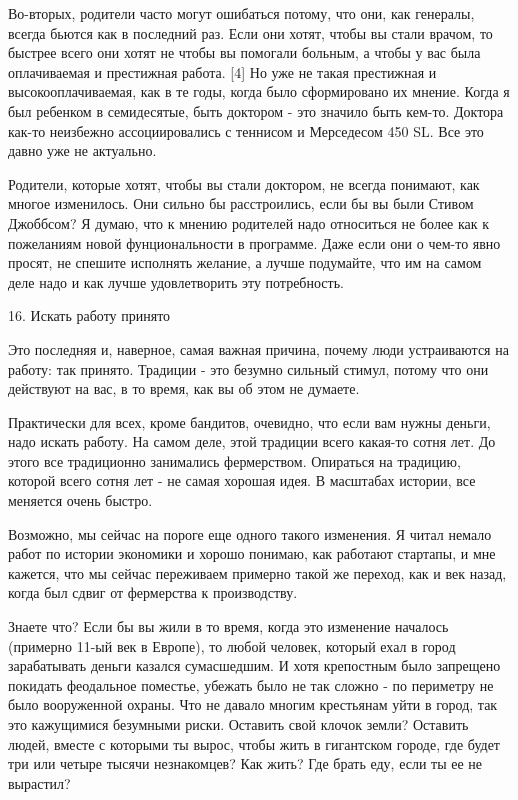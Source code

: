 \documentclass[ebook,12pt,oneside,openany]{memoir}
\begin{document}
Во-вторых, родители часто могут ошибаться потому, что они, как
генералы, всегда бьются как в последний раз. Если они хотят, чтобы вы
стали врачом, то быстрее всего они хотят не чтобы вы помогали больным,
а чтобы у вас была оплачиваемая и престижная работа. [4] Но уже не
такая престижная и высокооплачиваемая, как в те годы, когда было
сформировано их мнение. Когда я был ребенком в семидесятые, быть
доктором - это значило быть кем-то. Доктора как-то неизбежно
ассоциировались с теннисом и Мерседесом 450 SL. Все это давно уже не
актуально.

Родители, которые хотят, чтобы вы стали доктором, не всегда понимают,
как многое изменилось. Они сильно бы расстроились, если бы вы были
Стивом Джоббсом? Я думаю, что к мнению родителей надо относиться не
более как к пожеланиям новой фунциональности в программе. Даже если
они о чем-то явно просят, не спешите исполнять желание, а лучше
подумайте, что им на самом деле надо и как лучше удовлетворить эту
потребность.

16. Искать работу принято

Это последняя и, наверное, самая важная причина, почему люди
устраиваются на работу: так принято. Традиции - это безумно сильный
стимул, потому что они действуют на вас, в то время, как вы об этом не
думаете.

Практически для всех, кроме бандитов, очевидно, что если вам нужны
деньги, надо искать работу. На самом деле, этой традиции всего
какая-то сотня лет. До этого все традиционно занимались фермерством.
Опираться на традицию, которой всего сотня лет - не самая хорошая
идея. В масштабах истории, все меняется очень быстро.

Возможно, мы сейчас на пороге еще одного такого изменения. Я читал
немало работ по истории экономики и хорошо понимаю, как работают
стартапы, и мне кажется, что мы сейчас переживаем примерно такой же
переход, как и век назад, когда был сдвиг от фермерства к
производству.

Знаете что? Если бы вы жили в то время, когда это изменение началось
(примерно 11-ый век в Европе), то любой человек, который ехал в город
зарабатывать деньги казался сумасшедшим. И хотя крепостным было
запрещено покидать феодальное поместье, убежать было не так сложно -
по периметру не было вооруженной охраны. Что не давало многим
крестьянам уйти в город, так это кажущимися безумными риски. Оставить
свой клочок земли? Оставить людей, вместе с которыми ты вырос, чтобы
жить в гигантском городе, где будет три или четыре тысячи незнакомцев?
Как жить? Где брать еду, если ты ее не вырастил?
\end{document}
